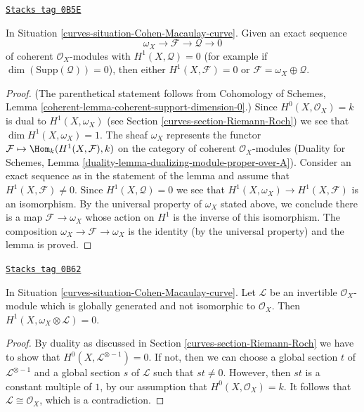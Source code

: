 \begin{lemma}[Vanishing]
\label{curves-lemma-vanishing}
\href{https://stacks.math.columbia.edu/tag/0B5E}{\texttt{Stacks tag 0B5E}}

In Situation \ref{curves-situation-Cohen-Macaulay-curve}. Given an exact sequence
$$
\omega_X \to \mathcal{F} \to \mathcal{Q} \to 0
$$
of coherent $\mathcal{O}_X$-modules with $H^1(X, \mathcal{Q}) = 0$
(for example if $\dim(\text{Supp}(\mathcal{Q})) = 0$), then
either $H^1(X, \mathcal{F}) = 0$ or
$\mathcal{F} = \omega_X \oplus \mathcal{Q}$.
\end{lemma}

\begin{proof}
(The parenthetical statement follows from
Cohomology of Schemes, Lemma \ref{coherent-lemma-coherent-support-dimension-0}.)
Since $H^0(X, \mathcal{O}_X) = k$ is dual to $H^1(X, \omega_X)$
(see Section \ref{curves-section-Riemann-Roch})
we see that $\dim H^1(X, \omega_X) = 1$. The sheaf $\omega_X$
represents the functor
$\mathcal{F} \mapsto \Hom_k(H^1(X, \mathcal{F}), k)$
on the category of coherent $\mathcal{O}_X$-modules
(Duality for Schemes, Lemma
\ref{duality-lemma-dualizing-module-proper-over-A}).
Consider an exact sequence as in the statement of the lemma
and assume that $H^1(X, \mathcal{F}) \not = 0$. Since
$H^1(X, \mathcal{Q}) = 0$ we see that
$H^1(X, \omega_X) \to H^1(X, \mathcal{F})$ is an isomorphism.
By the universal property of $\omega_X$ stated above, we conclude there
is a map $\mathcal{F} \to \omega_X$ whose action on $H^1$ is the inverse
of this isomorphism. The composition $\omega_X \to \mathcal{F} \to \omega_X$
is the identity (by the universal property) and the lemma is proved.
\end{proof}

\begin{lemma}
\label{curves-lemma-vanishing-twist}
\href{https://stacks.math.columbia.edu/tag/0B62}{\texttt{Stacks tag 0B62}}

In Situation \ref{curves-situation-Cohen-Macaulay-curve}. Let
$\mathcal{L}$ be an invertible $\mathcal{O}_X$-module which is
globally generated and not isomorphic to $\mathcal{O}_X$. Then
$H^1(X, \omega_X \otimes \mathcal{L}) = 0$.
\end{lemma}

\begin{proof}
By duality as discussed in Section \ref{curves-section-Riemann-Roch} we have to
show that $H^0(X, \mathcal{L}^{\otimes - 1}) = 0$. If not, then we can
choose a global section $t$ of $\mathcal{L}^{\otimes - 1}$
and a global section $s$ of $\mathcal{L}$ such that $st \not = 0$.
However, then $st$ is a constant multiple of $1$, by our assumption
that $H^0(X, \mathcal{O}_X) = k$. It follows that
$\mathcal{L} \cong \mathcal{O}_X$, which is a contradiction.
\end{proof}

